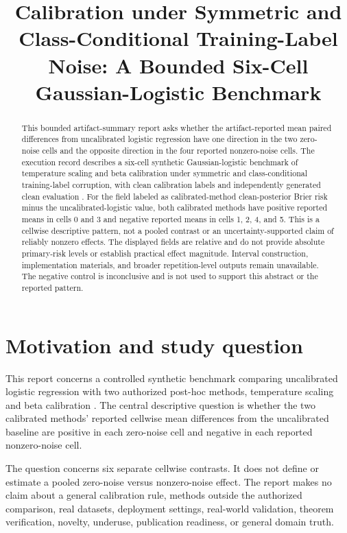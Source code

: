 \documentclass{article}
\title{Calibration under Symmetric and Class-Conditional Training-Label Noise: A Bounded Six-Cell Gaussian-Logistic Benchmark}
\begin{document}
\maketitle

\begin{abstract}
This bounded artifact-summary report asks whether the artifact-reported mean paired differences from uncalibrated logistic regression have one direction in the two zero-noise cells and the opposite direction in the four reported nonzero-noise cells. The execution record describes a six-cell synthetic Gaussian-logistic benchmark of temperature scaling and beta calibration under symmetric and class-conditional training-label corruption, with clean calibration labels and independently generated clean evaluation \cite{exec}. For the field labeled as calibrated-method clean-posterior Brier risk minus the uncalibrated-logistic value, both calibrated methods have positive reported means in cells 0 and 3 and negative reported means in cells 1, 2, 4, and 5. This is a cellwise descriptive pattern, not a pooled contrast or an uncertainty-supported claim of reliably nonzero effects. The displayed fields are relative and do not provide absolute primary-risk levels or establish practical effect magnitude. Interval construction, implementation materials, and broader repetition-level outputs remain unavailable. The negative control is inconclusive and is not used to support this abstract or the reported pattern.
\end{abstract}

\section{Motivation and study question}
This report concerns a controlled synthetic benchmark comparing uncalibrated logistic regression with two authorized post-hoc methods, temperature scaling and beta calibration \cite{exec}. The central descriptive question is whether the two calibrated methods' reported cellwise mean differences from the uncalibrated baseline are positive in each zero-noise cell and negative in each reported nonzero-noise cell.

The question concerns six separate cellwise contrasts. It does not define or estimate a pooled zero-noise versus nonzero-noise effect. The report makes no claim about a general calibration rule, methods outside the authorized comparison, real datasets, deployment settings, real-world validation, theorem verification, novelty, underuse, publication readiness, or general domain truth.
\end{document}

